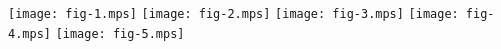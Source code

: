 \documentclass[a5paper,10pt]{book}
\begin{document}
\texttt{[image: fig-1.mps]}
\newpage
\texttt{[image: fig-2.mps]}
\texttt{[image: fig-3.mps]}
\texttt{[image: fig-4.mps]}
\texttt{[image: fig-5.mps]}
\end{document}
